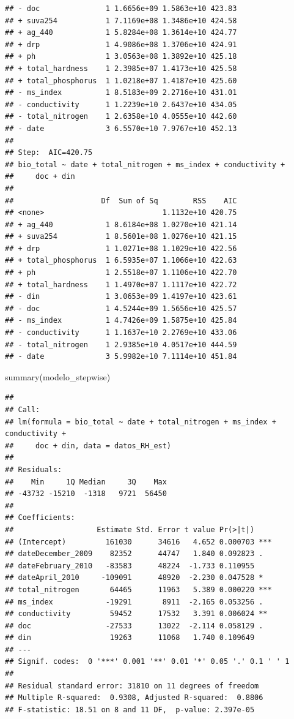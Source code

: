 \documentclass[
]{book}
\newenvironment{Shaded}{\begin{snugshade}}{\end{snugshade}}
\newcommand{\FunctionTok}[1]{\textcolor[rgb]{0.00,0.00,0.00}{#1}}
\newcommand{\NormalTok}[1]{#1}
\begin{document}
\begin{verbatim}
## - doc               1 1.6656e+09 1.5863e+10 423.83
## + suva254           1 7.1169e+08 1.3486e+10 424.58
## + ag_440            1 5.8284e+08 1.3614e+10 424.77
## + drp               1 4.9086e+08 1.3706e+10 424.91
## + ph                1 3.0563e+08 1.3892e+10 425.18
## + total_hardness    1 2.3985e+07 1.4173e+10 425.58
## + total_phosphorus  1 1.0218e+07 1.4187e+10 425.60
## - ms_index          1 8.5183e+09 2.2716e+10 431.01
## - conductivity      1 1.2239e+10 2.6437e+10 434.05
## - total_nitrogen    1 2.6358e+10 4.0555e+10 442.60
## - date              3 6.5570e+10 7.9767e+10 452.13
## 
## Step:  AIC=420.75
## bio_total ~ date + total_nitrogen + ms_index + conductivity + 
##     doc + din
## 
##                    Df  Sum of Sq        RSS    AIC
## <none>                           1.1132e+10 420.75
## + ag_440            1 8.6184e+08 1.0270e+10 421.14
## + suva254           1 8.5601e+08 1.0276e+10 421.15
## + drp               1 1.0271e+08 1.1029e+10 422.56
## + total_phosphorus  1 6.5935e+07 1.1066e+10 422.63
## + ph                1 2.5518e+07 1.1106e+10 422.70
## + total_hardness    1 1.4970e+07 1.1117e+10 422.72
## - din               1 3.0653e+09 1.4197e+10 423.61
## - doc               1 4.5244e+09 1.5656e+10 425.57
## - ms_index          1 4.7426e+09 1.5875e+10 425.84
## - conductivity      1 1.1637e+10 2.2769e+10 433.06
## - total_nitrogen    1 2.9385e+10 4.0517e+10 444.59
## - date              3 5.9982e+10 7.1114e+10 451.84
\end{verbatim}

\begin{Shaded}
\begin{Highlighting}[]
\FunctionTok{summary}\NormalTok{(modelo\_stepwise)}
\end{Highlighting}
\end{Shaded}

\begin{verbatim}
## 
## Call:
## lm(formula = bio_total ~ date + total_nitrogen + ms_index + conductivity + 
##     doc + din, data = datos_RH_est)
## 
## Residuals:
##    Min     1Q Median     3Q    Max 
## -43732 -15210  -1318   9721  56450 
## 
## Coefficients:
##                   Estimate Std. Error t value Pr(>|t|)    
## (Intercept)         161030      34616   4.652 0.000703 ***
## dateDecember_2009    82352      44747   1.840 0.092823 .  
## dateFebruary_2010   -83583      48224  -1.733 0.110955    
## dateApril_2010     -109091      48920  -2.230 0.047528 *  
## total_nitrogen       64465      11963   5.389 0.000220 ***
## ms_index            -19291       8911  -2.165 0.053256 .  
## conductivity         59452      17532   3.391 0.006024 ** 
## doc                 -27533      13022  -2.114 0.058129 .  
## din                  19263      11068   1.740 0.109649    
## ---
## Signif. codes:  0 '***' 0.001 '**' 0.01 '*' 0.05 '.' 0.1 ' ' 1
## 
## Residual standard error: 31810 on 11 degrees of freedom
## Multiple R-squared:  0.9308, Adjusted R-squared:  0.8806 
## F-statistic: 18.51 on 8 and 11 DF,  p-value: 2.397e-05
\end{verbatim}
\end{document}

